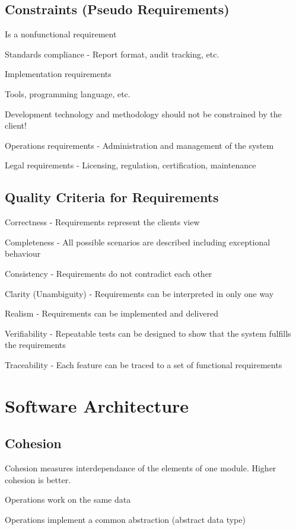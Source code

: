 \documentclass[10pt]{article}
\begin{document}
\subsection{Constraints (Pseudo Requirements)}
\enumstart
	\item Is a nonfunctional requirement
	\item Standards compliance - Report format, audit tracking, etc.
	\item Implementation requirements
	\enumstart
		\item Tools, programming language, etc.
		\item Development technology and methodology should not be constrained by the client!
	\enumend
	\item Operations requirements - Administration and management of the system
	\item Legal requirements - Licensing, regulation, certification, maintenance
\enumend

\subsection{Quality Criteria for Requirements}
\enumstart
	\item Correctness - Requirements represent the clients view
	\item Completeness - All possible scenarios are described including exceptional behaviour
	\item Consistency - Requirements do not contradict each other
	\item Clarity (Unambiguity) - Requirements can be interpreted in only one way
	\item Realism - Requirements can be implemented and delivered
	\item Verifiability - Repeatable tests can be designed to show that the system fulfills the requirements
	\item Traceability - Each feature can be traced to a set of functional requirements
\enumend

\section{Software Architecture}

\subsection{Cohesion}
Cohesion measures interdependance of the elements of one module. Higher cohesion is better.
\enumstart
	\item Operations work on the same data
	\item Operations implement a common abstraction (abstract data type)
\enumend
\end{document}
